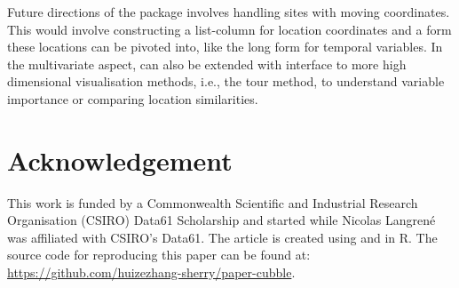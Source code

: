 \documentclass[
]{jss}
\begin{document}
Future directions of the package involves handling sites with moving coordinates. This would involve constructing a list-column for location coordinates and a form these locations can be pivoted into, like the long form for temporal variables. In the multivariate aspect,  can also be extended with interface to more high dimensional visualisation methods, i.e., the tour method, to understand variable importance or comparing location similarities.

\newpage

\hypertarget{acknowledgement}{%
\section{Acknowledgement}\label{acknowledgement}}

This work is funded by a Commonwealth Scientific and Industrial Research Organisation (CSIRO) Data61 Scholarship and started while Nicolas Langrené was affiliated with CSIRO's Data61. The article is created using  \citep{knitr} and  \citep{rmarkdown} in R. The source code for reproducing this paper can be found at: \url{https://github.com/huizezhang-sherry/paper-cubble}.


\end{document}

